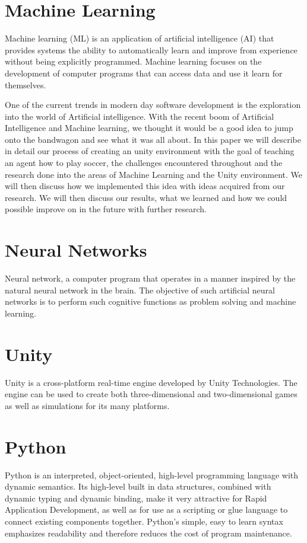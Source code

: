 \section{Machine Learning}
Machine learning (ML) is an application of artificial intelligence (AI) that provides systems the ability to automatically learn and improve from experience without being explicitly programmed. Machine learning focuses on the development of computer programs that can access data and use it learn for themselves.

One of the current trends in modern day software development is the exploration into the world of Artificial intelligence.
With the recent boom of Artificial Intelligence and Machine learning, we thought it would be a good idea to jump onto the bandwagon and see what it was all about.
In this paper we will describe in detail our process of creating an unity environment with the goal of teaching an agent how to play soccer, the challenges encountered throughout and the research done into the areas of Machine Learning and the Unity environment.  We will then discuss how we implemented this idea with ideas acquired from our research. We will then discuss our results, what we learned and how we could possible improve on in the future with further research.

\section{Neural Networks}
Neural network, a computer program that operates in a manner inspired by the natural neural network in the brain. The objective of such artificial neural networks is to perform such cognitive functions as problem solving and machine learning.
\section{Unity}
Unity is a cross-platform real-time engine developed by Unity Technologies. The engine can be used to create both three-dimensional and two-dimensional games as well as simulations for its many platforms.
\section{Python}
Python is an interpreted, object-oriented, high-level programming language with dynamic semantics. Its high-level built in data structures, combined with dynamic typing and dynamic binding, make it very attractive for Rapid Application Development, as well as for use as a scripting or glue language to connect existing components together. Python's simple, easy to learn syntax emphasizes readability and therefore reduces the cost of program maintenance. 


